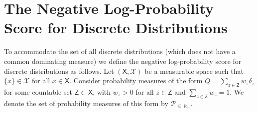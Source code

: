 \documentclass{article}
\theoremstyle{plain}
\theoremstyle{plain}
\theoremstyle{definition}
\theoremstyle{remark}
\theoremstyle{plain}
\newcommand{\xset}{\mathsf{X}}
\begin{document}
\section{The Negative Log-Probability Score for Discrete Distributions}\label{app:discretelogprob}
To accommodate the set of all discrete distributions (which does not have a common dominating measure) we define the negative log-probability score for discrete distributions as follows. Let $(\mathsf{X},\mathcal{X})$ be a measurable space such that $\{x\}\in\mathcal{X}$ for all $x \in \mathsf{X}$. Consider probability measures of the form $Q = \sum_{z \in \mathsf{Z}} w_z \delta_{z}$ for some countable set $\mathsf{Z} \subset \xset$, with $w_z > 0$ for all $z\in\mathsf{Z}$ and $\sum_{z \in \mathsf{Z}} w_z = 1$. We denote the set of probability measures of this form by $\mathcal{P}_{\le \aleph_0}$. 
\end{document}
